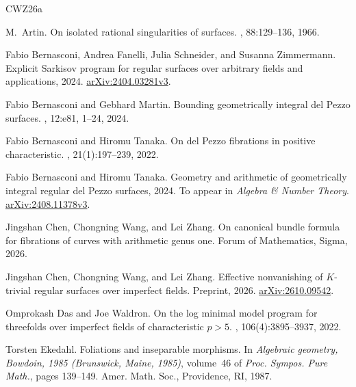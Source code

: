 \documentclass[reqno,oneside]{amsart}
\theoremstyle{definition}
\theoremstyle{plain}
\numberwithin{equation}{section}
\begin{document}
% 
%  
\begin{thebibliography}{CWZ26a}

M.~Artin.
\newblock On isolated rational singularities of surfaces.
, 88:129--136, 1966.

Fabio Bernasconi, Andrea Fanelli, Julia Schneider, and Susanna Zimmermann.
\newblock Explicit Sarkisov program for regular surfaces over arbitrary fields and applications, 2024.
\newblock \href{https://arxiv.org/abs/2404.03281v3}{arXiv:2404.03281v3}.

Fabio Bernasconi and Gebhard Martin.
\newblock Bounding geometrically integral del {Pezzo} surfaces.
, 12:e81, 1--24, 2024.

Fabio Bernasconi and Hiromu Tanaka.
\newblock On del {Pezzo} fibrations in positive characteristic.
, 21(1):197--239, 2022.

Fabio Bernasconi and Hiromu Tanaka.
\newblock Geometry and arithmetic of geometrically integral regular del Pezzo surfaces, 2024.
\newblock To appear in {\em Algebra \& Number Theory}.
\newblock \href{https://arxiv.org/abs/2408.11378v3}{arXiv:2408.11378v3}.

Jingshan Chen, Chongning Wang, and Lei Zhang.
\newblock On canonical bundle formula for fibrations of curves with arithmetic genus one.
\newblock Forum of Mathematics, Sigma, 2026.

Jingshan Chen, Chongning Wang, and Lei Zhang.
\newblock Effective nonvanishing of {$K$}-trivial regular surfaces over imperfect fields.
\newblock Preprint, 2026.
\newblock \href{https://arxiv.org/abs/2610.09542}{arXiv:2610.09542}.

Omprokash Das and Joe Waldron.
\newblock On the log minimal model program for threefolds over imperfect fields of characteristic {$p>5$}.
, 106(4):3895--3937, 2022.

Torsten Ekedahl.
\newblock Foliations and inseparable morphisms.
\newblock In {\em Algebraic geometry, {B}owdoin, 1985 ({B}runswick, {M}aine, 1985)}, volume~46 of {\em Proc. Sympos. Pure Math.}, pages 139--149. Amer. Math. Soc., Providence, RI, 1987.


\end{thebibliography}
\end{document}
